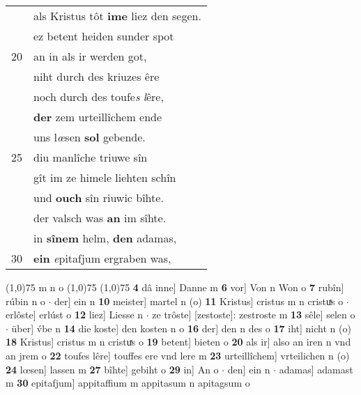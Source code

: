 \documentclass[8pt,a4paper,notitlepage]{article}
\begin{document}
\begin{table}[ht]
\begin{minipage}[t]{0.5\linewidth}
\begin{tabular}{rl}
 & als Kristus tôt \textbf{ime} liez den segen.\\ 
 & ez betent heiden sunder spot\\ 
20 & an in als ir werden got,\\ 
 & niht durch des kriuzes êre\\ 
 & noch durch des toufe\textit{s} \textit{l}êre,\\ 
 & \textbf{der} zem urteillîchem ende\\ 
 & uns l\textit{œ}sen \textbf{sol} gebende.\\ 
25 & diu manlîche triuwe sîn\\ 
 & gît im ze himele liehten schîn\\ 
 & und \textbf{ouch} sîn riuwic bîhte.\\ 
 & der valsch was \textbf{an} im sîhte.\\ 
 & in \textbf{sînem} helm, \textbf{den} adamas,\\ 
30 & \textbf{ein} \textit{e}pitafjum ergraben was,\\ 
\end{tabular}
\scriptsize
\line(1,0){75} \newline
m n o \newline
\line(1,0){75} \newline
\newline
\line(1,0){75} \newline
\textbf{4} dâ inne] Danne m \textbf{6} vor] Von n Won o \textbf{7} rubîn] rúbin n o  $\cdot$ der] ein n \textbf{10} meister] martel n (o) \textbf{11} Kristus] cristus m n cristuͯs o  $\cdot$ erlôste] erlúst o \textbf{12} liez] Liesse n  $\cdot$ ze trôste] [zestoste]: zestroste m \textbf{13} sêle] selen o  $\cdot$ über] v́be n \textbf{14} die koste] den kosten n o \textbf{16} der] den n des o \textbf{17} iht] nicht n (o) \textbf{18} Kristus] cristus m n cristuͯs o \textbf{19} betent] bieten o \textbf{20} als ir] also an iren n vnd an jrem o \textbf{22} toufes lêre] touffes ere vnd lere m \textbf{23} urteillîchem] vrteilichen n (o) \textbf{24} lœsen] lassen m \textbf{27} bîhte] gebiht o \textbf{29} in] An o  $\cdot$ den] ein n  $\cdot$ adamas] adamast m \textbf{30} epitafjum] appitaffium m appitasum n apitagsum o \newline
\end{minipage}
\end{table}
\newpage
\end{document}
